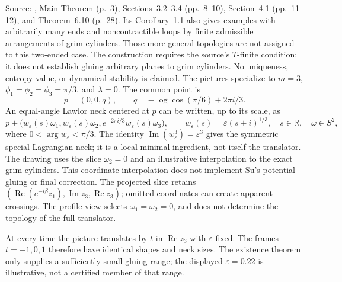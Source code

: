 \begin{example}
Source: \cite{CatSu2022}, Main Theorem (p.~3), Sections~3.2--3.4 (pp.~8--10), Section~4.1 (pp.~11--12), and Theorem~6.10 (p.~28). Its Corollary~1.1 also gives examples with arbitrarily many ends and noncontractible loops by finite admissible arrangements of grim cylinders. Those more general topologies are not assigned to this two-ended case. The construction requires the source's $T$-finite condition; it does not establish gluing arbitrary planes to grim cylinders. No uniqueness, entropy value, or dynamical stability is claimed. The pictures specialize to $m=3$, $\phi_1=\phi_2=\phi_3=\pi/3$, and $\lambda=0$. The common point is
\[
 p=(0,0,q),\qquad q=-\log\cos(\pi/6)+2\pi i/3.
\]
An equal-angle Lawlor neck centered at $p$ can be written, up to its scale, as
\[
 p+\bigl(w_\varepsilon(s)\omega_1,w_\varepsilon(s)\omega_2,
 e^{-2\pi i/3}w_\varepsilon(s)\omega_3\bigr),\qquad
 w_\varepsilon(s)=\varepsilon(s+i)^{1/3},\quad s\in\mathbb R,\quad\omega\in S^2,
\]
where $0<\arg w_\varepsilon<\pi/3$. The identity $\operatorname{Im}(w_\varepsilon^3)=\varepsilon^3$ gives the symmetric special Lagrangian neck; it is a local minimal ingredient, not itself the translator. The drawing uses the slice $\omega_2=0$ and an illustrative interpolation to the exact grim cylinders. This coordinate interpolation does not implement Su's potential gluing or final correction. The projected slice retains $(\operatorname{Re}(e^{-i\beta}z_1),\operatorname{Im}z_3,\operatorname{Re}z_3)$; omitted coordinates can create apparent crossings. The profile view selects $\omega_1=\omega_2=0$, and does not determine the topology of the full translator.

At every time the picture translates by $t$ in $\operatorname{Re}z_3$ with $\varepsilon$ fixed. The frames $t=-1,0,1$ therefore have identical shapes and neck sizes. The existence theorem only supplies a sufficiently small gluing range; the displayed $\varepsilon=0.22$ is illustrative, not a certified member of that range.
\end{example}
